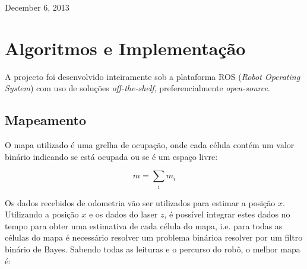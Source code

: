 \documentclass[journal]{IEEEtran}
\begin{document}



\hfill December 6, 2013

\section{Algoritmos e Implementação}

A projecto foi desenvolvido inteiramente sob a plataforma ROS (\textit{Robot Operating System}) com uso de soluções \textit{off-the-shelf}, preferencialmente \textit{open-source}.

\subsection{Mapeamento}
%

O mapa utilizado é uma grelha de ocupação, onde cada célula contém um valor binário indicando se está ocupada ou se é um espaço livre:

\begin{equation}
  \label{eq:map_1}
  m = \sum_{i} m_i
\end{equation}

Os dados recebidos de odometria vão ser utilizados para estimar a posição $x$. Utilizando a posição $x$ e os dados do laser $z$, é possível integrar estes dados no tempo para obter uma estimativa de cada célula do mapa, i.e. para todas as células do mapa é necessário resolver um problema binárioa resolver por um filtro binário de Bayes. Sabendo todas as leituras e o percurso do robô, o melhor mapa é:
\end{document}
